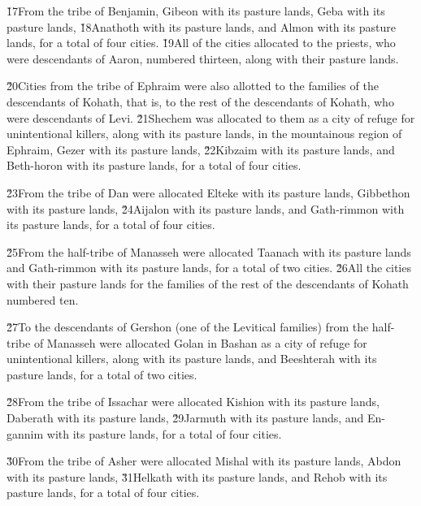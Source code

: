 \v{17}From the tribe of Benjamin, Gibeon with its pasture lands, Geba with its pasture lands, \v{18}Anathoth with its pasture lands, and Almon with its pasture lands, for a total of four cities. \v{19}All of the cities allocated to the priests, who were descendants of Aaron, numbered thirteen, along with their pasture lands.

\v{20}Cities from the tribe of Ephraim were also allotted to the families of the descendants of Kohath, that is, to the rest of the descendants of Kohath, who were descendants of Levi. \v{21}Shechem was allocated to them as a city of refuge for unintentional killers, along with its pasture lands, in the mountainous region of Ephraim, Gezer with its pasture lands, \v{22}Kibzaim with its pasture lands, and Beth-horon with its pasture lands, for a total of four cities.

\v{23}From the tribe of Dan were allocated Elteke with its pasture lands, Gibbethon with its pasture lands, \v{24}Aijalon with its pasture lands, and Gath-rimmon with its pasture lands, for a total of four cities.

\v{25}From the half-tribe of Manasseh were allocated Taanach with its pasture lands and Gath-rimmon with its pasture lands, for a total of two cities. \v{26}All the cities with their pasture lands for the families of the rest of the descendants of Kohath numbered ten.

\v{27}To the descendants of Gershon (one of the Levitical families) from the half-tribe of Manasseh were allocated Golan in Bashan as a city of refuge for unintentional killers, along with its pasture lands, and Beeshterah with its pasture lands, for a total of two cities.

\v{28}From the tribe of Issachar were allocated Kishion with its pasture lands, Daberath with its pasture lands, \v{29}Jarmuth with its pasture lands, and En-gannim with its pasture lands, for a total of four cities.

\v{30}From the tribe of Asher were allocated Mishal with its pasture lands, Abdon with its pasture lands, \v{31}Helkath with its pasture lands, and Rehob with its pasture lands, for a total of four cities.

